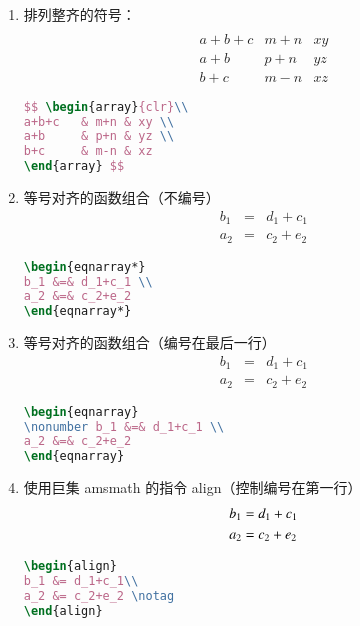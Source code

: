 \begin{enumerate}
\item 排列整齐的符号：
$$ \begin{array}{clr}\\
a+b+c   & m+n & xy \\
a+b     & p+n & yz \\
b+c     & m-n & xz
\end{array} $$
\begin{lstlisting}[language=TeX,numbers=none,frame=lrtb,keywords={begin}]
$$ \begin{array}{clr}\\
a+b+c   & m+n & xy \\
a+b     & p+n & yz \\
b+c     & m-n & xz
\end{array} $$
\end{lstlisting}

\item 等号对齐的函数组合（不编号）
\begin{eqnarray*}
b_1 &=& d_1+c_1 \\
a_2 &=& c_2+e_2
\end{eqnarray*}
\begin{lstlisting}[language=TeX,numbers=none,frame=lrtb,keywords={begin}]
\begin{eqnarray*}
b_1 &=& d_1+c_1 \\
a_2 &=& c_2+e_2
\end{eqnarray*}
\end{lstlisting}

\item 等号对齐的函数组合（编号在最后一行）
\begin{eqnarray}
\nonumber b_1 &=& d_1+c_1 \\
a_2 &=& c_2+e_2
\end{eqnarray}
\begin{lstlisting}[language=TeX,numbers=none,frame=lrtb,keywords={begin}]
\begin{eqnarray}
\nonumber b_1 &=& d_1+c_1 \\
a_2 &=& c_2+e_2
\end{eqnarray}
\end{lstlisting}

\item 使用巨集 amsmath 的指令 align（控制编号在第一行）
\begin{align}
b_1 &= d_1+c_1\\
a_2 &= c_2+e_2 \notag
\end{align}
\begin{lstlisting}[language=TeX,numbers=none,frame=lrtb,keywords={begin}]
\begin{align}
b_1 &= d_1+c_1\\
a_2 &= c_2+e_2 \notag
\end{align}
\end{lstlisting}


\end{enumerate}
